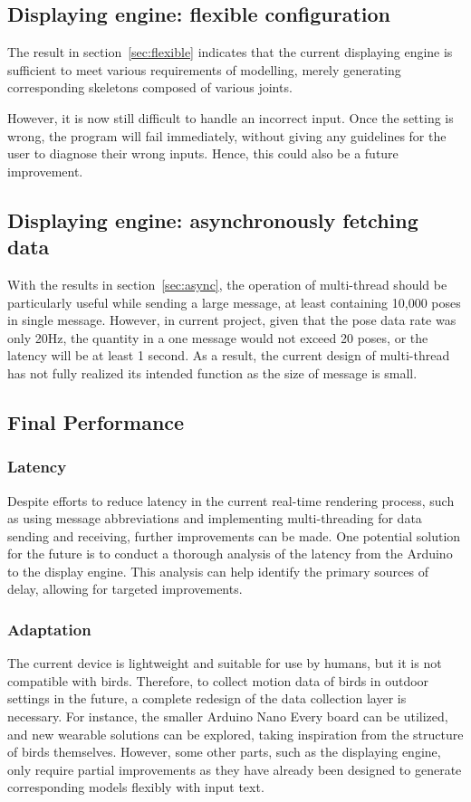 \subsection{Displaying engine: flexible configuration}

The result in section~\ref{sec:flexible} indicates that the current displaying engine is sufficient to meet various requirements of modelling, merely generating corresponding skeletons composed of various joints.

However, it is now still difficult to handle an incorrect input.
Once the setting is wrong, the program will fail immediately, without giving any guidelines for the user to diagnose their wrong inputs.
Hence, this could also be a future improvement.


\subsection{Displaying  engine:  asynchronously  fetching data}
With the results in section~\ref{sec:async}, the operation of multi-thread should be particularly useful while sending a large message, at least containing 10,000 poses in single message.
However, in current project, given that the pose data rate was only 20Hz, the quantity in a one message would not exceed 20 poses, or the latency will be at least 1 second.
As a result, the current design of multi-thread has not fully realized its intended function as the size of message is small.

\subsection{Final Performance}

\subsubsection{Latency}
Despite efforts to reduce latency in the current real-time rendering process, such as using message abbreviations and implementing multi-threading for data sending and receiving, further improvements can be made.
One potential solution for the future is to conduct a thorough analysis of the latency from the Arduino to the display engine.
This analysis can help identify the primary sources of delay, allowing for targeted improvements.

\subsubsection{Adaptation}
The current device is lightweight and suitable for use by humans, but it is not compatible with birds.
Therefore, to collect motion data of birds in outdoor settings in the future, a complete redesign of the data collection layer is necessary.
For instance, the smaller Arduino Nano Every board can be utilized, and new wearable solutions can be explored, taking inspiration from the structure of birds themselves.
However, some other parts, such as the displaying engine, only require partial improvements as they have already been designed to generate corresponding models flexibly with input text.

